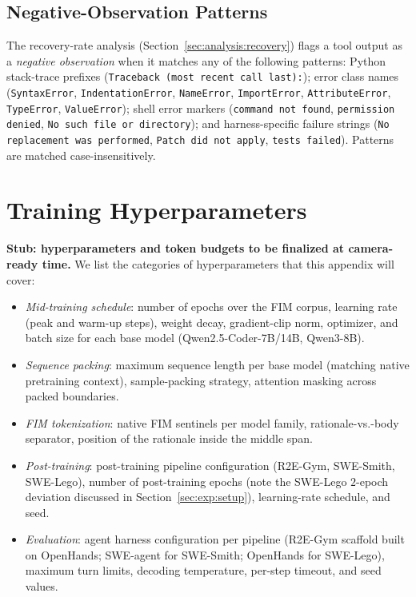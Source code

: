 \subsection{Negative-Observation Patterns}
\label{app:algo:neg_patterns}

The recovery-rate analysis (Section~\ref{sec:analysis:recovery}) flags
a tool output as a \emph{negative observation} when it matches any of
the following patterns: Python stack-trace prefixes
(\texttt{Traceback (most recent call last):}); error class names
(\texttt{SyntaxError}, \texttt{IndentationError}, \texttt{NameError},
\texttt{ImportError}, \texttt{AttributeError}, \texttt{TypeError},
\texttt{ValueError}); shell error markers
(\texttt{command not found}, \texttt{permission denied}, \texttt{No such file or directory});
and harness-specific failure strings
(\texttt{No replacement was performed}, \texttt{Patch did not apply},
\texttt{tests failed}). Patterns are matched case-insensitively.

\section{Training Hyperparameters}
\label{app:hp}

\textbf{Stub: hyperparameters and token budgets to be finalized at
camera-ready time.} We list the categories of hyperparameters that this
appendix will cover:

\begin{itemize}\setlength\itemsep{0.1em}
  \item \emph{Mid-training schedule}: number of epochs over the FIM
        corpus, learning rate (peak and warm-up steps), weight decay,
        gradient-clip norm, optimizer, and batch size for each base
        model (Qwen2.5-Coder-7B/14B, Qwen3-8B).
  \item \emph{Sequence packing}: maximum sequence length per base
        model (matching native pretraining context), sample-packing
        strategy, attention masking across packed boundaries.
  \item \emph{FIM tokenization}: native FIM sentinels per model
        family, rationale-vs.-body separator, position of the rationale
        inside the middle span.
  \item \emph{Post-training}: post-training pipeline configuration
        (R2E-Gym, SWE-Smith, SWE-Lego), number of post-training epochs
        (note the SWE-Lego $2$-epoch deviation discussed in
        Section~\ref{sec:exp:setup}), learning-rate schedule, and seed.
  \item \emph{Evaluation}: agent harness configuration per pipeline
        (R2E-Gym scaffold built on OpenHands; SWE-agent for SWE-Smith;
        OpenHands for SWE-Lego), maximum turn limits, decoding
        temperature, per-step timeout, and seed values.
\end{itemize}


